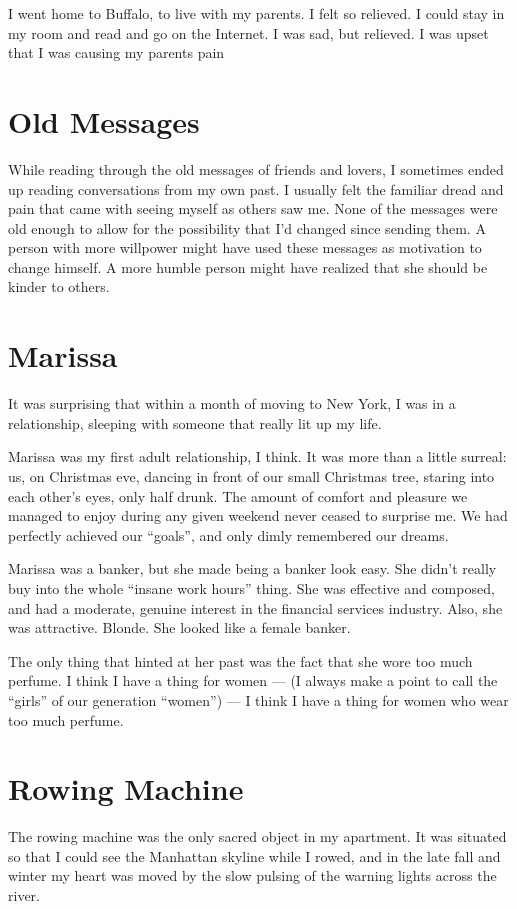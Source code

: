\documentclass[12pt]{article}
\begin{document}
I went home to Buffalo, to live with my parents.  I felt so relieved.  I could
stay in my room and read and go on the Internet.  I was sad, but relieved.  I
was upset that I was causing my parents pain

\section{Old Messages}
While reading through the old messages of friends and lovers, I
sometimes ended up reading conversations from my own past.  I usually
felt the familiar dread and pain that came  with seeing myself as others
saw me.  None of the messages were old enough to allow for the
possibility that I'd changed since sending them.  A person with more
willpower might have used these messages as motivation to
change himself.  A more humble person might have realized that she
should be kinder to others.

\section{Marissa}
It was surprising that within a month of moving to New York, I was
in a relationship, sleeping with someone that really lit up my life.

Marissa was my first adult relationship, I think.  It was more than a
little surreal: us, on Christmas eve, dancing in front of our small
Christmas tree, staring into each other's eyes, only half drunk.  The
amount of comfort and pleasure we managed to enjoy during any given weekend
never ceased to surprise me.  We had perfectly
achieved our ``goals'', and only dimly remembered our dreams.

Marissa was a banker, but she made being a banker look easy.  She didn't really
buy into the whole ``insane work hours'' thing.  She was effective and composed,
and had a moderate, genuine interest in the financial services industry.  Also,
she was attractive.  Blonde.  She looked like a female banker. 

The only thing that hinted at her past was the fact that she wore too
much perfume.  I think I have a thing for women --- (I always make a point
to call the ``girls'' of our generation ``women'') --- I think I have a thing
for women who wear too much perfume.

\section{Rowing Machine}
The rowing machine was the only sacred object in my apartment.  It
was situated so that I could see the Manhattan skyline while I
rowed, and in the late fall and winter my heart was moved by the slow
pulsing of the warning lights across the river.
\end{document}
